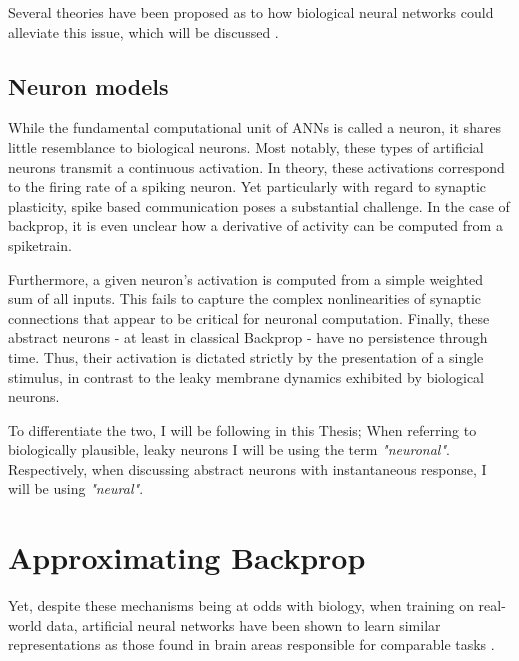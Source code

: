 Several theories have been proposed as to how biological neural networks could alleviate this issue, which will be 
discussed .

\subsection*{Neuron models}

While the fundamental computational unit of ANNs is called a neuron, it shares little resemblance to biological neurons.
Most notably, these types of artificial neurons transmit a continuous activation. In theory, these activations correspond
to the firing rate of a spiking neuron. Yet particularly with regard to synaptic plasticity, spike based communication
poses a substantial challenge. In the case of backprop, it is even unclear how a derivative of activity can be computed
from a spiketrain.

Furthermore, a given neuron's activation is computed from a simple weighted sum of all inputs. This fails to capture the
complex nonlinearities of synaptic connections that appear to be critical for neuronal computation. Finally, these 
abstract neurons - at least in classical Backprop - have no persistence through time. Thus, their activation is dictated
strictly by the presentation of a single stimulus, in contrast to the leaky membrane dynamics exhibited by biological
neurons.

To differentiate the two, I will be following \cite{Haider2021} in this Thesis; When referring to biologically 
plausible, leaky neurons I will be using the term \textit{"neuronal"}. Respectively, when discussing abstract neurons with
instantaneous response, I will be using \textit{"neural"}.







\section{Approximating Backprop}


Yet, despite these mechanisms being at odds with biology, when training on real-world data, artificial neural networks
have been shown to learn similar representations as those found in brain areas responsible for comparable tasks
\cite{whittington2019theories,Yamins2016}.


